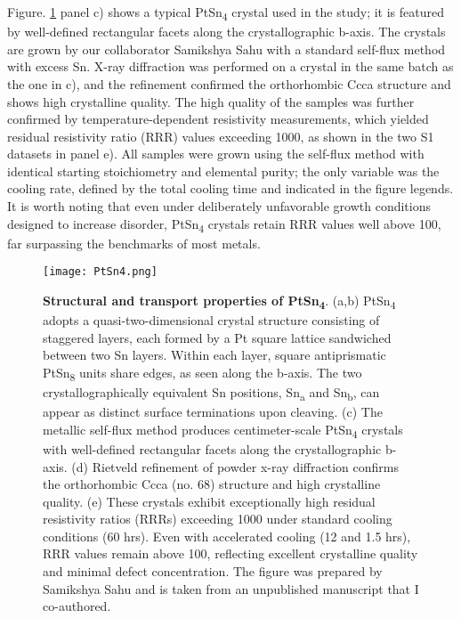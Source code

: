 Figure. \ref{fig:crystal_struc} panel c) shows a typical PtSn\textsubscript{4} crystal used in the study; it is featured by well-defined rectangular facets along the crystallographic b-axis. The crystals are grown by our collaborator Samikshya Sahu with a standard self-flux method with excess Sn. X-ray diffraction was performed on a crystal in the same batch as the one in c), and the refinement confirmed the orthorhombic Ccca structure and shows high crystalline quality. The high quality of the samples was further confirmed by temperature-dependent resistivity measurements, which yielded residual resistivity ratio (RRR) values exceeding 1000, as shown in the two S1 datasets in panel e). All samples were grown using the self-flux method with identical starting stoichiometry and elemental purity; the only variable was the cooling rate, defined by the total cooling time and indicated in the figure legends. It is worth noting that even under deliberately unfavorable growth conditions designed to increase disorder, PtSn\textsubscript{4} crystals retain RRR values well above 100, far surpassing the benchmarks of most metals.

\begin{figure}
	\centering
	\texttt{[image: PtSn4.png]}
	\caption[\textbf{Structural and transport properties of PtSn\textsubscript{4}}]{\textbf{Structural and transport properties of PtSn\textsubscript{4}}. (a,b) PtSn\textsubscript{4} adopts a quasi-two-dimensional crystal structure consisting of staggered layers, each formed by a Pt square lattice sandwiched between two Sn layers. Within each layer, square antiprismatic PtSn\textsubscript{8} units share edges, as seen along the b-axis. The two crystallographically equivalent Sn positions, Sn\textsubscript{a} and Sn\textsubscript{b}, can appear as distinct surface terminations upon cleaving. (c) The metallic self-flux method produces centimeter-scale PtSn\textsubscript{4} crystals with well-defined rectangular facets along the crystallographic b-axis. (d) Rietveld refinement of powder x-ray diffraction confirms the orthorhombic Ccca (no. 68) structure and high crystalline quality. (e) These crystals exhibit exceptionally high residual resistivity ratios (RRRs) exceeding 1000 under standard cooling conditions (60 hrs). Even with accelerated cooling (12 and 1.5 hrs), RRR values remain above 100, reflecting excellent crystalline quality and minimal defect concentration. The figure was prepared by Samikshya Sahu and is taken from an unpublished manuscript that I co-authored.}
	\label{fig:crystal_struc}
\end{figure}

